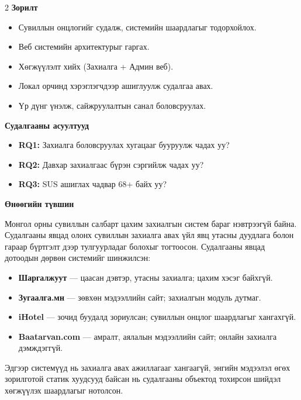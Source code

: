 \begin{multicols}{2}
\textbf{Зорилт}

\begin{itemize}[leftmargin=1.2em, itemsep=2pt]
  \item Сувиллын онцлогийг судалж, системийн шаардлагыг тодорхойлох.
  \item Веб системийн архитектурыг гаргах.
  \item Хөгжүүлэлт хийх (Захиалга + Админ веб).
  \item Локал орчинд хэрэглэгчдээр ашиглуулж судалгаа авах.
  \item Үр дүнг үнэлж, сайжруулалтын санал боловсруулах.
\end{itemize}

\textbf{Судалгааны асуултууд}

\begin{itemize}[leftmargin=1.2em, itemsep=1pt]
  \item \textbf{RQ1:} Захиалга боловсруулах хугацааг бууруулж чадах уу? 
  \item \textbf{RQ2:} Давхар захиалгаас бүрэн сэргийлж чадах уу? 
  \item \textbf{RQ3:} SUS ашиглах чадвар 68+ байх уу? 
\end{itemize}

\textbf{Өнөөгийн түвшин}

Монгол орны сувиллын салбарт цахим захиалгын систем бараг нэвтрээгүй байна. Судалгааны явцад олонх сувиллын захиалга авах үйл явц утасны дуудлага болон гараар бүртгэлт дээр тулгуурладаг болохыг тогтоосон. Судалгааны явцад дотоодын дөрвөн системийг шинжилсэн:

\begin{itemize}[leftmargin=1.2em, itemsep=1pt]
  \item \textbf{Шаргалжуут} --- цаасан дэвтэр, утасны захиалга; цахим хэсэг байхгүй.
  \item \textbf{Зугаалга.мн} --- зөвхөн мэдээллийн сайт; захиалгын модуль дутмаг.
  \item \textbf{iHotel} --- зочид буудалд зориулсан; сувиллын онцлог шаардлагыг хангахгүй.
  \item \textbf{Baatarvan.com} --- амралт, аялалын мэдээллийн сайт; онлайн захиалга дэмждэггүй.
\end{itemize}

Эдгээр системүүд нь захиалга авах ажиллагааг хангаагүй, энгийн мэдээлэл өгөх зорилготой статик хуудсууд байсан нь судалгааны объектод тохирсон шийдэл хөгжүүлэх шаардлагыг нотолсон.


\end{multicols}
